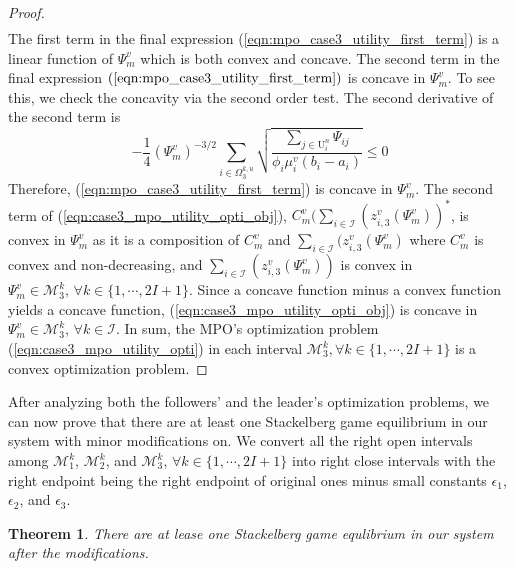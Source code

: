 \documentclass[conference]{IEEEtran}
\newtheorem{theorem}{Theorem}
\begin{document}
\begin{proof}
\begin{align}
\end{align}
The first term in the final expression (\ref{eqn:mpo_case3_utility_first_term}) is a linear function of $\Psi_m^v$ which is both convex and concave. The second term in the final expression $(\ref{eqn:mpo_case3_utility_first_term})$ is concave in $\Psi_m^v$. To see this, we check the concavity via the second order test. The second derivative of the second term is 
\begin{equation}
 -\frac{1}{4}(\Psi_m^v)^{-3/2}\sum_{i \in \Omega_3^{k,u}} \sqrt{\frac{\sum_{j \in \mathrm{U}_i^n}\Psi_{ij}}{\phi_i \mu_i^v(b_i-a_i)}} \leq 0 
\end{equation}
Therefore, (\ref{eqn:mpo_case3_utility_first_term}) is concave in $\Psi_m^v$. The second term of (\ref{eqn:case3_mpo_utility_opti_obj}), $C_m^v\big(\sum_{i \in \mathcal{I}} (z_{i,3}^v(\Psi_m^v))^*$, is convex in $\Psi_m^v$ as it is a composition of $C_m^v$ and $\sum_{i \in \mathcal{I}} (z_{i,3}^v(\Psi_m^v)$ where $C_m^v$ is convex and non-decreasing, and $\sum_{i \in \mathcal{I}} (z_{i,3}^v(\Psi_m^v))$ is convex in $\Psi_m^v \in \mathcal{M}_3^k,\, \forall k \in \{1, \cdots, 2I+1\}$. Since a concave function minus a convex function yields a concave function, (\ref{eqn:case3_mpo_utility_opti_obj}) is concave in $\Psi_m^v \in \mathcal{M}_3^k,\, \forall k \in \mathcal{I}$. In sum, the MPO's optimization problem (\ref{eqn:case3_mpo_utility_opti}) in each interval $\mathcal{M}_3^k, \forall k \in \{1, \cdots, 2I+1\}$ is a convex optimization problem. \qedhere
\end{proof}
After analyzing both the followers' and the leader's optimization problems, we can now prove that there are at least one Stackelberg game equilibrium in our system with minor modifications on. We convert all the right open intervals among $\mathcal{M}_1^k$, $\mathcal{M}_2^k$, and $\mathcal{M}_3^k$, $\forall k \in \{1, \cdots, 2I+1\}$ into right close intervals with the right endpoint being the right endpoint of original ones minus small constants $\epsilon_1$, $\epsilon_2$, and $\epsilon_3$. 
\begin{theorem} \label{thm:stackelberg_game_equilibrium}
There are at lease one Stackelberg game equlibrium in our system after the modifications.  
\end{theorem}
\end{document}
